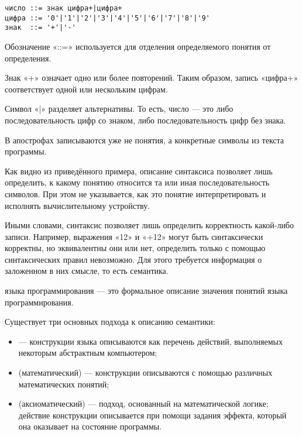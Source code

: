 \begin{verbatim}
число ::= знак цифра+|цифра+
цифра ::= '0'|'1'|'2'|'3'|'4'|'5'|'6'|'7'|'8'|'9'
знак  ::= '+'|'-'
\end{verbatim}

Обозначение «::=» используется для отделения определяемого понятия от
определения.

Знак «+» означает одно или более повторений. Таким образом, запись
«цифра+» соответствует одной или нескольким цифрам.

Символ «|» разделяет альтернативы. То есть, число — это либо
последовательность цифр со знаком, либо последовательность цифр без
знака.

В апострофах записываются уже не понятия, а конкретные символы из
текста программы.


Как видно из приведённого примера, описание синтаксиса позволяет лишь
определить, к какому понятию относится та или иная последовательность
символов.  При этом не указывается, как это понятие интерпретировать и
исполнять вычислительному устройству.

Иными словами, синтаксис позволяет лишь определить корректность какой-либо
записи. Например, выражения «12» и «+12» могут быть синтаксически
корректны, но эквивалентны они или нет, определить только с помощью
синтаксических правил невозможно. Для этого требуется информация о
заложенном в них смысле, то есть семантика.

\begin{defn}
 языка программирования — это формальное описание
значения понятий языка программирования.
\end{defn}

Существует три основных подхода к описанию семантики:

\begin{itemize}
\item {} — конструкции языка
  описываются как перечень действий, выполняемых некоторым абстрактным
  компьютером;
\item {} (математический) —
  конструкции описываются с помощью различных математических понятий;
\item {} (аксиоматический)
  — подход, основанный на математической логике; действие конструкции
  описывается при помощи задания эффекта, который она оказывает на
  состояние программы.
\end{itemize}

